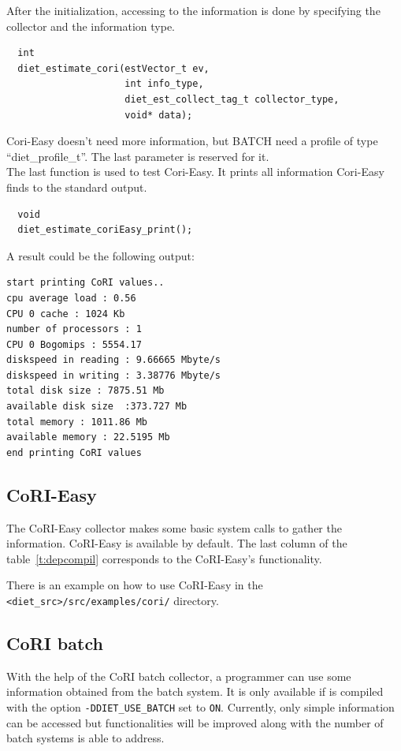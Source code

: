 After the initialization, accessing to the information is done by specifying
the collector and the information type.
\footnotesize
\begin{verbatim}
  int
  diet_estimate_cori(estVector_t ev,
                     int info_type,
                     diet_est_collect_tag_t collector_type,
                     void* data);
\end{verbatim}
\normalsize

Cori-Easy doesn't need more information, but BATCH need a profile of
type ``diet\_profile\_t''. The last parameter is reserved for it. \\ The last
function is used to test Cori-Easy. It prints all information Cori-Easy finds
to the standard output.

\footnotesize
\begin{verbatim}
  void
  diet_estimate_coriEasy_print();
\end{verbatim}
\normalsize
A result could be the following output:
\footnotesize
\begin{verbatim}
start printing CoRI values..
cpu average load : 0.56
CPU 0 cache : 1024 Kb
number of processors : 1
CPU 0 Bogomips : 5554.17
diskspeed in reading : 9.66665 Mbyte/s
diskspeed in writing : 3.38776 Mbyte/s
total disk size : 7875.51 Mb
available disk size  :373.727 Mb
total memory : 1011.86 Mb
available memory : 22.5195 Mb
end printing CoRI values
\end{verbatim}
\normalsize

\subsection{CoRI-Easy}
The CoRI-Easy collector makes some basic system calls to gather the
information. CoRI-Easy is available by default. The last column of the
table~\ref{t:depcompil} corresponds to the CoRI-Easy's functionality.

There is an example on how to use CoRI-Easy in the
\verb!<diet_src>/src/examples/cori/! directory.

\subsection{CoRI batch}\label{section:cori_batch}

With the help of the CoRI batch collector, a \sed programmer can use some
information obtained from the batch system. It is only available if \diet is
compiled with the option \texttt{-DDIET\_USE\_BATCH} set to
\texttt{ON}. Currently, only simple information can be accessed but
functionalities will be improved along with the number of batch systems \diet
is able to address.

